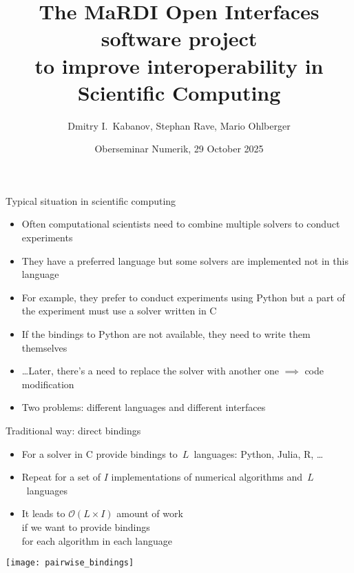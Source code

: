 \documentclass[
  10pt,
  aspectratio=169,
  english,
]{beamer}
\title{%
  The MaRDI Open Interfaces software project\\to improve interoperability in
  Scientific Computing}
\author{Dmitry I.\ Kabanov, Stephan Rave, Mario Ohlberger}
\institute{Mathematics Münster, University of Münster, Germany}
\date{Oberseminar Numerik, 29 October 2025}
\begin{document}
\maketitle

\begin{frame}{Typical situation in scientific computing}
  \begin{itemize}
    \item Often computational scientists need
          to combine multiple solvers to conduct experiments
    \item They have a preferred language but some solvers are implemented
          not in this language
    \item For example, they prefer to conduct experiments using Python
          but a part of the experiment must use a solver written in C
    \item If the bindings to Python are not available, they need to write
          them themselves
    \item \dots Later, there's a need to replace the solver with
          another one $\implies$ code modification
    \item<2-> \alert{Two problems:} different languages and different interfaces
  \end{itemize}
\end{frame}

\begin{frame}{Traditional way: direct bindings}
  \begin{minipage}{0.45\textwidth}
    \begin{itemize}
      \item For a solver in C provide bindings to~$L$~languages: Python, Julia, R, \dots
      \item Repeat for a set of $I$ implementations of numerical algorithms
            and~$L$~languages
      \item It leads to $\mathcal O(L \times I)$ amount of work\\
      if we want to provide bindings\\
      for each algorithm in each language
    \end{itemize}
  \end{minipage}\hfill
  \begin{minipage}{0.45\textwidth}
    \centering
    \texttt{[image: pairwise\_bindings]}
  \end{minipage}
\end{frame}
\end{document}
